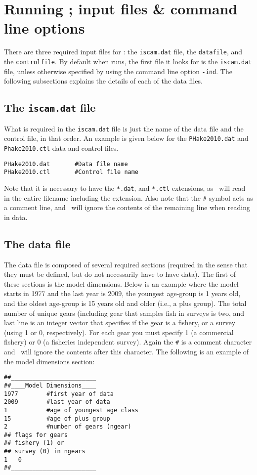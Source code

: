 
\section{Running \iscam; input files \& command line options}
\begin{multicols}{2}


There are three required input files for \iscam: the \verb"iscam.dat" file, the \verb"datafile", and the \verb"controlfile".  By default when \iscam runs, the first file it looks for is the \verb"iscam.dat" file, unless otherwise specified by using the command line option \verb"-ind".  The following subsections explains the details of each of the data files.


\subsection{The \texttt{iscam.dat} file}
What is required in the \verb"iscam.dat" file is just the name of the data file and the control file, in that order.  An example is given below for the \texttt{PHake2010.dat} and \texttt{Phake2010.ctl} data and control files.
\begin{verbatim}
PHake2010.dat		#Data file name
PHake2010.ctl		#Control file name
\end{verbatim}
Note that it is necessary to have the \verb"*.dat", and \verb"*.ctl" extensions, as \iscam\ will read in the entire filename including the extension.  Also note that the \verb"#" symbol acts as a comment line, and \iscam\ will ignore the contents of the remaining line when reading in data.

\subsection{The data file}
The data file is composed of several required sections (required in the sense that they must be defined, but do not necessarily have to have data).  The first of these sections is the model dimensions.  Below is an example where the model starts in 1977 and the last year is 2009, the youngest age-group is 1 years old, and the oldest age-group is 15 years old and older (i.e., a plus group).  The total number of unique gears (including gear that samples fish in surveys is two, and last line is an integer vector that specifies if the gear is a fishery, or a survey (using 1 or 0, respectively).  For each gear you must specify 1 (a commercial fishery) or 0 (a fisheries independent survey).  Again the \verb"#" is a comment character and \iscam\ will ignore the contents after this character.  The following is an example of the model dimensions section:
\begin{verbatim}
##________________________
##____Model Dimensions____
1977		#first year of data
2009		#last year of data
1			#age of youngest age class
15			#age of plus group
2			#number of gears (ngear)
## flags for gears 
## fishery (1) or 
## survey (0) in ngears
1	0
##________________________
\end{verbatim}


\end{multicols}
